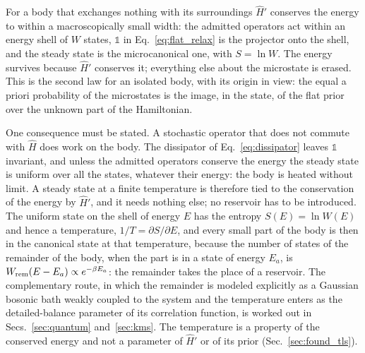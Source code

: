 \documentclass[10pt,a4paper]{article}
\begin{document}
For a body that exchanges nothing with its surroundings $ \hat H' $ conserves the energy to within a macroscopically small width: the admitted operators act within an energy shell of $ W $ states, $ \mathbb{1} $ in Eq.~\eqref{eq:flat_relax} is the projector onto the shell, and the steady state is the microcanonical one, with $ S = \ln W $.
The energy survives because $ \hat H' $ conserves it; everything else about the microstate is erased.
This is the second law for an isolated body, with its origin in view: the equal a priori probability of the microstates is the image, in the state, of the flat prior over the unknown part of the Hamiltonian.

One consequence must be stated.
A stochastic operator that does not commute with $ \hat H $ does work on the body.
The dissipator of Eq.~\eqref{eq:dissipator} leaves $ \mathbb{1} $ invariant, and unless the admitted operators conserve the energy the steady state is uniform over all the states, whatever their energy: the body is heated without limit.
A steady state at a finite temperature is therefore tied to the conservation of the energy by $ \hat H' $, and it needs nothing else; no reservoir has to be introduced.
The uniform state on the shell of energy $ E $ has the entropy $ S(E) = \ln W(E) $ and hence a temperature, $ 1/T = \partial S/\partial E $, and every small part of the body is then in the canonical state at that temperature, because the number of states of the remainder of the body, when the part is in a state of energy $ E_a $, is $ W_{\rm rem}(E - E_a) \propto e^{-\beta E_a} $: the remainder takes the place of a reservoir.
The complementary route, in which the remainder is modeled explicitly as a Gaussian bosonic bath weakly coupled to the system and the temperature enters as the detailed-balance parameter of its correlation function, is worked out in Secs.~\ref{sec:quantum} and~\ref{sec:kms}.
The temperature is a property of the conserved energy and not a parameter of $ \hat H' $ or of its prior (Sec.~\ref{sec:found_tls}).
\end{document}
